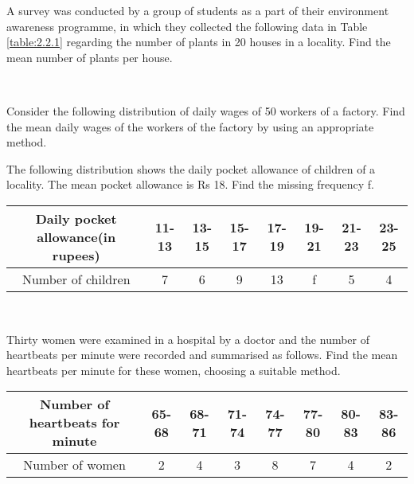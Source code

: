 \item A survey was conducted by a group of students as a part of their environment awareness
programme, in which they collected the following data in Table \ref{table:2.2.1}
regarding the number of plants in
20 houses in a locality. Find the mean number of plants per house.
\begin{table}[!ht]
\centering
{}
\caption{}
\label{table:2.2.1}
\end{table}
\\
\solution
%
\item Consider the following distribution of daily wages of 50 workers of a factory.
Find the mean daily wages of the workers of the factory by using an appropriate method.
\item The following distribution shows the daily pocket allowance of children of a locality.
The mean pocket allowance is Rs 18. Find the missing frequency f.
\begin{tabular}{|c|c|c|c|c|c|c|c|}
\hline
Daily pocket allowance(in rupees) &11-13&13-15&15-17&17-19&19-21&21-23&23-25\\
\hline
Number of children&7&6&9&13&f&5&4\\
\hline
\end{tabular}\\
\item Thirty women were examined in a hospital by a doctor and the number of heartbeats per
minute were recorded and summarised as follows. Find the mean heartbeats per minute
for these women, choosing a suitable method.
\begin{tabular}{|c|c|c|c|c|c|c|c|}
\hline
Number of heartbeats for minute &65-68&68-71&71-74&74-77&77-80&80-83&83-86\\
\hline
Number of women&2&4&3&8&7&4&2\\
\hline
\end{tabular}\\
